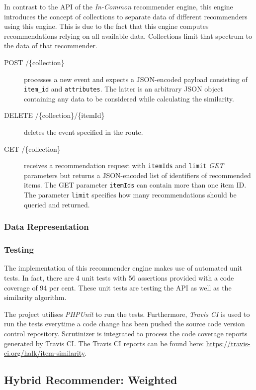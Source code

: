 In contrast to the API of the \emph{In-Common} recommender engine, this engine introduces the concept of collections to separate data of different recommenders using this engine. This is due to the fact that this engine computes recommendations relying on all available data. Collections limit that spectrum to the data of that recommender.

\begin{description}
    \item[POST /\{collection\}] processes a new event and expects a JSON-encoded payload consisting of \texttt{item_id} and \texttt{attributes}. The latter is an arbitrary JSON object containing any data to be considered while calculating the similarity.
    \item[DELETE /\{collection\}/\{itemId\}] deletes the event specified in the route.
    \item[GET /\{collection\}] receives a recommendation request with \texttt{itemIds} and \texttt{limit} \emph{GET} parameters but returns a JSON-encoded list of identifiers of recommended items. The GET parameter \texttt{itemIds} can contain more than one item ID. The parameter \texttt{limit} specifies how many recommendations should be queried and returned.
\end{description}

\subsubsection{Data Representation}

\subsubsection{Testing}

The implementation of this recommender engine makes use of automated unit tests. In fact, there are 4 unit tests with 56 assertions provided with a code coverage of 94 per cent. These unit tests are testing the API as well as the similarity algorithm.

The project utilises \emph{PHPUnit} to run the tests. Furthermore, \emph{Travis CI} is used to run the tests everytime a code change has been pushed the source code version control repository. Scrutinizer is integrated to process the code coverage reports generated by Travis CI. The Travis CI reports can be found here: \url{https://travis-ci.org/halk/item-similarity}.

\subsection{Hybrid Recommender: Weighted}

